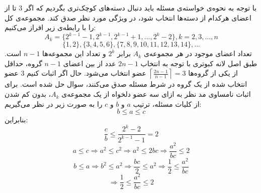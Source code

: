 \p
با توجه به نحوه‌ی خواسته‌ی مسئله باید دنبال دسته‌های کوچک‌تری بگردیم که اگر 3 تا از اعضای هرکدام از دسته‌ها انتخاب شود، در ویژگی مورد نظر صدق کند. مجموعه‌ی کل را با رابطه‌ی زیر افراز می‌کنیم:
    \[A_k = \{2^{k-1}-1,2^{k-1},2^{k-1}+1,...,2^{k}-2\} , k=2,3,...,n\]
    \[\{1,2\}, \{3,4,5,6\}, \{7,8,9,10,11,12,13,14\}, ...\]
    تعداد اعضای موجود در هر مجموعه‌ی
    $A_k$
    برابر
    \(2^k\)
    و تعداد این مجموعه‌ها
     $n-1$
     است. طبق اصل لانه کبوتری با توجه به انتخاب
     $2n-1$
     عدد از بین اعضای
      $n-1$ 
     گروه، حداقل از یکی از گروه‌ها 
     $\left \lceil \frac{2n-1}{n-1} \right \rceil = 3$
      عضو انتخاب می‌شود. حال اگر اثبات کنیم
      $3$ 
     عضو انتخاب شده از یک گروه در شرط مسئله صدق می‌کنند، سوال حل شده است.
     \p
    برای اثبات نامساوی مد نظر به ازای سه عضو دلخواه از یک مجموعه‌ی
    $A_k$،
    بدون کم شدن از کلیات مسئله، ترتیب 
    $a$
    و
    $b$
    و
    $c$
    را به صورت زیر در نظر می‌گیریم:
    $$b\leq a\leq c$$
    بنابراین:
    $$\frac{c}{b} \leq \frac{2^k-2}{2^{k-1}-1} = 2$$
    \[a\leq c \Rightarrow a^2\leq c^2 \Rightarrow a^2\leq 2bc \Rightarrow \frac{a^2}{bc}\leq 2\]
    \[b\leq a \Rightarrow b^2\leq a^2 \Rightarrow \frac{bc}{2}\leq a^2 \Rightarrow \frac{1}{2}\leq\frac{a^2}{bc}\]
    \[\Rightarrow \frac{1}{2}\leq\frac{a^2}{bc}\leq2\]